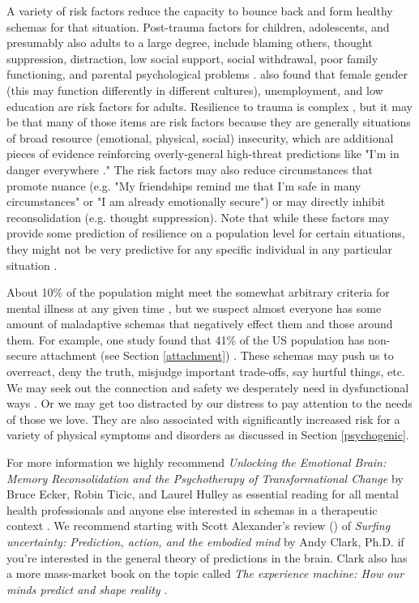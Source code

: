 \documentclass[12pt,letterpaper]{book}
\begin{document}
A variety of risk factors reduce the capacity to bounce back and form healthy schemas for that situation. Post-trauma factors for children, adolescents, and presumably also adults to a large degree, include blaming others, thought suppression, distraction, low social support, social withdrawal, poor family functioning, and parental psychological problems \cite{trickeyRiskFactors}. \cite{tangRiskFactors} also found that female gender (this may function differently in different cultures), unemployment, and low education are risk factors for adults. Resilience to trauma is complex \cite{bonanno2008loss}, but it may be that many of those items are risk factors because they are generally situations of broad resource (emotional, physical, social) insecurity, which are additional pieces of evidence reinforcing overly-general high-threat predictions like "I'm in danger everywhere \cite{berghSelfEvidencing}." The risk factors may also reduce circumstances that promote nuance (e.g. "My friendships remind me that I'm safe in many circumstances" or "I am already emotionally secure") or may directly inhibit reconsolidation (e.g. thought suppression). Note that while these factors may provide some prediction of resilience on a population level for certain situations, they might not be very predictive for any specific individual in any particular situation \cite{bonannoRelilienceParadox}.

About 10\% of the population might meet the somewhat arbitrary criteria for mental illness at any given time \cite{whoMentalHealth}, but we suspect almost everyone has some amount of maladaptive schemas that negatively effect them and those around them. For example, one study found that 41\% of the US population has non-secure attachment (see Section \ref{attachment}) \cite{mickelson1997adult}. These schemas may push us to overreact, deny the truth, misjudge important trade-offs, say hurtful things, etc. We may seek out the connection and safety we desperately need in dysfunctional ways \cite{brownAttachmentDisturbances}. Or we may get too distracted by our distress to pay attention to the needs of those we love. They are also associated with significantly increased risk for a variety of physical symptoms and disorders as discussed in Section \ref{psychogenic}.

For more information we highly recommend \textit{Unlocking the Emotional Brain: Memory Reconsolidation and the Psychotherapy of Transformational Change} by Bruce Ecker, Robin Ticic, and Laurel Hulley as essential reading for all mental health professionals and anyone else interested in schemas in a therapeutic context \cite{eckerUnlocking}. We recommend starting with Scott Alexander's review (\textcite{clark2015surfing}) of \textit{Surfing uncertainty: Prediction, action, and the embodied mind} by Andy Clark, Ph.D. if you're interested in the general theory of predictions in the brain. Clark also has a more mass-market book on the topic called \textit{The experience machine: How our minds predict and shape reality} \cite{clark2024experience}.
\end{document}
